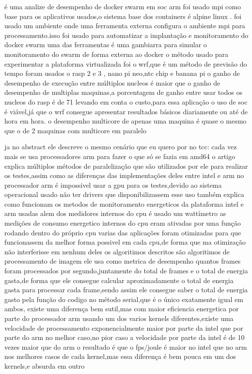 \documentclass[
	12pt,				%
	openright,			%
	oneside,			%
	a4paper,			%
	english,			%
	french,				%
	spanish,			%
	brazil,				%
	]{abntex2}
\begin{document}
é uma analize de desempenho de docker swarm em soc arm 
foi usado mpi como base para os aplicativos usados,o sistema base dos containers é alpine linux .
foi usado um ambiente onde uma ferramenta externa configura o ambiente mpi para processamento.isso foi usado para automatizar a implantação e monitoramento do docker swarm 
uma das ferramentas é uma gambiarra para simular o monitoramento do swarm de forma externa ao docker
o método usado para experimentar a plataforma virtualizada foi o wrf,que é um método de previsão do tempo
foram usados o rasp 2 e 3 , nano pi neo,ntc chip e banana pi
o ganho de desempenho de execução entre múltiplos nucleos é maior que o ganho de desempenho de multiplas maquinas,a porcentagem de ganho entre usar todos os nucleos do rasp é de 71%
levando em conta o custo,para essa aplicação o uso de soc é viável,já que o wrf consegue apresentar resultados básicos diariamente ou até de hora em hora.
o desempenho multicore de apenas uma maquina é quase o mesmo que o de 2 maquinas com multicore em paralelo

ja no abstract ele descreve o mesmo cenário que eu quero por no tcc: cada vez mais se usa processadores arm para fazer o que só se fazia em amd64
o artigo explica múltiplos métodos de paralelização que são utilizados por ele para realizar os testes,assim como as diferenças das implementações deles entre intel e arm
no processador arm é impossivel usar a gpu para os testes,devido ao sistema operacional usado não ter drivers que disponibilizassem esse uso
também explica como funcionam os metodos de monitoramento energeticos da plataforma intel e arm usadas
alem dos medidores internos do cpu é usado um wattímetro
as medições de consumo energetico internos do cpu eram ativadas por uma função rodando dentro do próprio cpu 
varias das aplicações foram otimizadas para que funcionassem da melhor forma possivel em cada cpu,de forma que ma otimização não interferisse em nenhum deles
os algoritimos descritos são algoritimos de processamento de imagem
ele usa como metrica de desempenho quantos frames foram processados por segundo,juntamente do total de frames e o total de energia gasta,de forma que ele consegue calcular aproximadamente o total de energia gasta para processar cada frame,sendo assim ele consegue saber o total de energia gasto pela função do codigo
no método serial,que é o único exatamente igual em ambos, existe uma diferença bem sutil,mas com maior eficiencia energetica por parte do processador arm
usando um dos varios kernels diferentes,existe uma velocidade de processamento exponencialmente maior por parte da intel que por parte do arm no melhor caso,no pior caso a velocidade por parte da intel é de 10 vezes maior que do arm
o resultado é que o fps/joule é maior no intel que no arm nos melhores casos de cada kernel,mas essa diferença é bem pouca em um dos kernels,e absurda em outro
\end{document}
